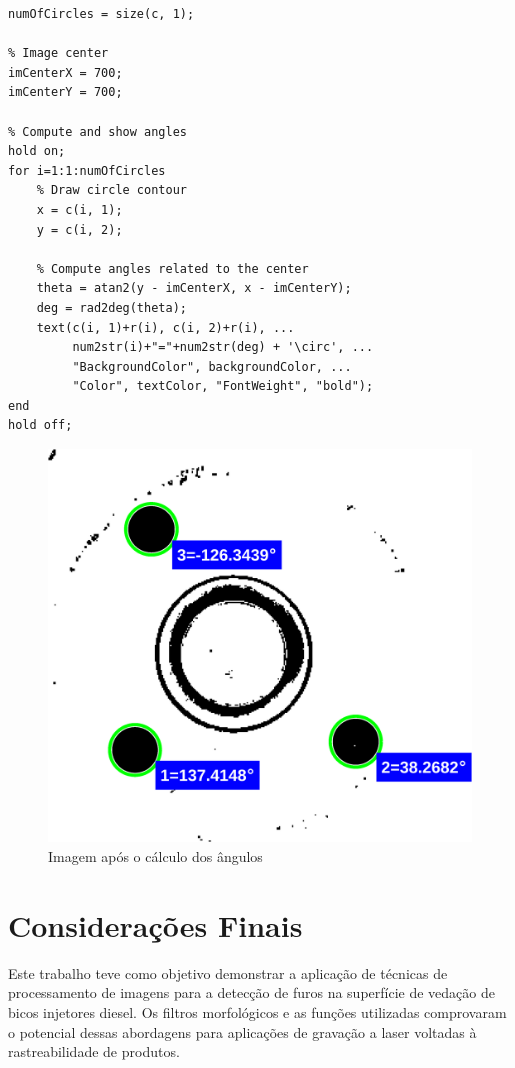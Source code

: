 \documentclass[conference]{IEEEtran}
\begin{document}
\begin{lstlisting}[caption={Cálculo dos ângulos em relação ao centro da imagem}, label={lst:codigo-compute-angle}]
% Get number of circles
numOfCircles = size(c, 1);

% Image center
imCenterX = 700;
imCenterY = 700;
	
% Compute and show angles
hold on;
for i=1:1:numOfCircles
	% Draw circle contour
	x = c(i, 1);
	y = c(i, 2);
	
	% Compute angles related to the center 
	theta = atan2(y - imCenterX, x - imCenterY);
	deg = rad2deg(theta);
	text(c(i, 1)+r(i), c(i, 2)+r(i), ...
		 num2str(i)+"="+num2str(deg) + '\circ', ...
		 "BackgroundColor", backgroundColor, ...
		 "Color", textColor, "FontWeight", "bold");
end
hold off;
\end{lstlisting}

\begin{figure}[h]
	\centering
	\includegraphics[scale=0.70]{Images/Image0000_computed.png}
	\caption{Imagem após o cálculo dos ângulos}
	\label{fig:compute-angle}
\end{figure}

\section*{Considerações Finais}
Este trabalho teve como objetivo demonstrar a aplicação de técnicas de processamento de imagens para a detecção de furos na superfície de vedação de bicos injetores diesel. Os filtros morfológicos e as funções utilizadas comprovaram o potencial dessas abordagens para aplicações de gravação a laser voltadas à rastreabilidade de produtos.
\end{document}

